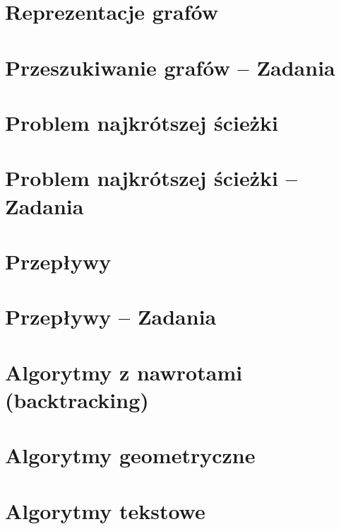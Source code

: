 \section{Reprezentacje grafów}

\section{Przeszukiwanie grafów -- Zadania}

\section{Problem najkrótszej ścieżki}

\section{Problem najkrótszej ścieżki -- Zadania}

\section{Przepływy}

\section{Przepływy -- Zadania}

\section{Algorytmy z nawrotami (backtracking)}

\section{Algorytmy geometryczne}

\section{Algorytmy tekstowe}


